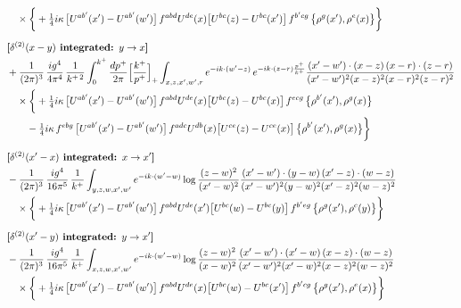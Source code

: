 \documentclass[10pt]{article}
\numberwithin{equation}{section}
\begin{document}
\begin{align}
&\quad\times\bigg\{+\tfrac14 i\kappa\,\big[U^{ab^{\prime}}(x^{\prime})-U^{ab^{\prime}}(w^{\prime})\big]\,f^{abd}U^{de}(x)\big[U^{bc}(z)-U^{bc}(x^{\prime})\big]\,f^{b^{\prime}cg}\,\big\{\rho^{g}(x^{\prime}),\rho^{e}(x)\big\}\bigg\}\notag\\[6pt]
&\textbf{[$\delta^{(2)}(x-y)$ integrated: $y\to x$]}\notag\\
&+\frac{1}{(2\pi)^{3}}\,\frac{ig^{4}}{4\pi^{4}}\,\frac{1}{k^{+\,2}}\int_{0}^{k^{+}}\frac{dp^{+}}{2\pi}\Big[\frac{k^{+}}{p^{+}}\Big]_{+}\int_{x,z,x^{\prime},w^{\prime},r}e^{-ik\cdot(w^{\prime}-z)}\,e^{-ik\cdot(z-r)\frac{p^{+}}{k^{+}}}\frac{(x^{\prime}-w^{\prime})\cdot(x-z)\,(x-r)\cdot(z-r)}{(x^{\prime}-w^{\prime})^{2}(x-z)^{2}(x-r)^{2}(z-r)^{2}}\notag\\
&\quad\times\bigg\{+\tfrac14 i\kappa\,\big[U^{ab^{\prime}}(x^{\prime})-U^{ab^{\prime}}(w^{\prime})\big]\,f^{abd}U^{de}(x)\big[U^{bc}(z)-U^{bc}(x)\big]\,f^{ecg}\,\big\{\rho^{b^{\prime}}(x^{\prime}),\rho^{g}(x)\big\}\notag\\&\qquad-\tfrac14 i\kappa\,f^{ebg}\,\big[U^{ab^{\prime}}(x^{\prime})-U^{ab^{\prime}}(w^{\prime})\big]\,f^{adc}U^{db}(x)\big[U^{ce}(z)-U^{ce}(x)\big]\,\big\{\rho^{b^{\prime}}(x^{\prime}),\rho^{g}(x)\big\}\bigg\}\notag\\[6pt]
&\textbf{[$\delta^{(2)}(x^{\prime}-x)$ integrated: $x\to x^{\prime}$]}\notag\\
&-\frac{1}{(2\pi)^{3}}\,\frac{ig^{4}}{16\pi^{5}}\,\frac{1}{k^{+}}\int_{y,z,w,x^{\prime},w^{\prime}}e^{-ik\cdot(w^{\prime}-w)}\log\frac{(z-w)^{2}}{(x^{\prime}-w)^{2}}\frac{(x^{\prime}-w^{\prime})\cdot(y-w)\,(x^{\prime}-z)\cdot(w-z)}{(x^{\prime}-w^{\prime})^{2}(y-w)^{2}(x^{\prime}-z)^{2}(w-z)^{2}}\notag\\
&\quad\times\bigg\{+\tfrac14 i\kappa\,\big[U^{ab^{\prime}}(x^{\prime})-U^{ab^{\prime}}(w^{\prime})\big]\,f^{abd}U^{de}(x^{\prime})\big[U^{bc}(w)-U^{bc}(y)\big]\,f^{b^{\prime}eg}\,\big\{\rho^{g}(x^{\prime}),\rho^{c}(y)\big\}\bigg\}\notag\\[6pt]
&\textbf{[$\delta^{(2)}(x^{\prime}-y)$ integrated: $y\to x^{\prime}$]}\notag\\
&-\frac{1}{(2\pi)^{3}}\,\frac{ig^{4}}{16\pi^{5}}\,\frac{1}{k^{+}}\int_{x,z,w,x^{\prime},w^{\prime}}e^{-ik\cdot(w^{\prime}-w)}\log\frac{(z-w)^{2}}{(x-w)^{2}}\frac{(x^{\prime}-w^{\prime})\cdot(x^{\prime}-w)\,(x-z)\cdot(w-z)}{(x^{\prime}-w^{\prime})^{2}(x^{\prime}-w)^{2}(x-z)^{2}(w-z)^{2}}\notag\\
&\quad\times\bigg\{+\tfrac14 i\kappa\,\big[U^{ab^{\prime}}(x^{\prime})-U^{ab^{\prime}}(w^{\prime})\big]\,f^{abd}U^{de}(x)\big[U^{bc}(w)-U^{bc}(x^{\prime})\big]\,f^{b^{\prime}cg}\,\big\{\rho^{g}(x^{\prime}),\rho^{e}(x)\big\}\bigg\}\notag\\[6pt]

\end{align}
\end{document}
